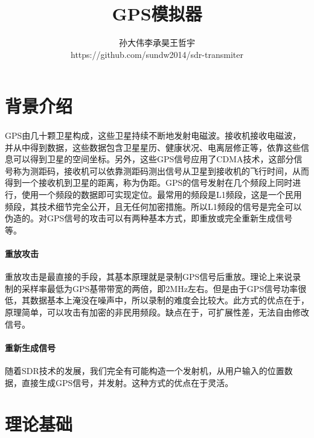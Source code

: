 \documentclass[UTF8,titlepage]{ctexart}
\title{GPS模拟器}
\author{孙大伟\hspace{1cm}李承昊\hspace{1cm}王哲宇\\https://github.com/sundw2014/sdr-transmiter}
\date{}
\begin{document}
\maketitle
\newpage
\section*{背景介绍}
\paragraph*{}GPS由几十颗卫星构成，这些卫星持续不断地发射电磁波。接收机接收电磁波，并从中得到数据，这些数据包含卫星星历、健康状况、电离层修正等，依靠这些信息可以得到卫星的空间坐标。另外，这些GPS信号应用了CDMA技术，这部分信号称为测距码，接收机可以依靠测距码测出信号从卫星到接收机的飞行时间，从而得到一个接收机到卫星的距离，称为伪距。GPS的信号发射在几个频段上同时进行，使用一个频段的数据即可实现定位。最常用的频段是L1频段，这是一个民用频段，其技术细节完全公开，且无任何加密措施。所以L1频段的信号是完全可以伪造的。对GPS信号的攻击可以有两种基本方式，即重放或完全重新生成信号等。
\paragraph*{重放攻击} 重放攻击是最直接的手段，其基本原理就是录制GPS信号后重放。理论上来说录制的采样率最低为GPS基带带宽的两倍，即2MHz左右。但是由于GPS信号功率很低，其数据基本上淹没在噪声中，所以录制的难度会比较大。此方式的优点在于，原理简单，可以攻击有加密的非民用频段。缺点在于，可扩展性差，无法自由修改信号。
\paragraph*{重新生成信号}随着SDR技术的发展，我们完全有可能构造一个发射机，从用户输入的位置数据，直接生成GPS信号，并发射。这种方式的优点在于灵活。
\section*{理论基础}
\end{document}
